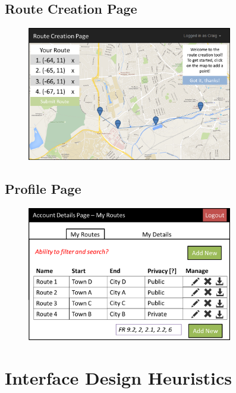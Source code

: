 \subsection{Route Creation Page}
\begin{figure}[!ht]
    \begin{center}
        \includegraphics[width=0.8\textwidth]{images/appendix/rcp1.png}
    \end{center}
    \vspace{-6mm}
\end{figure}

\subsection{Profile Page}
\begin{figure}[!ht]
    \begin{center}
        \includegraphics[width=0.8\textwidth]{images/appendix/prof1.png}
    \end{center}
    \vspace{-6mm}
\end{figure}


\newpage 
\section{Interface Design Heuristics}
\label{sec:idh}


